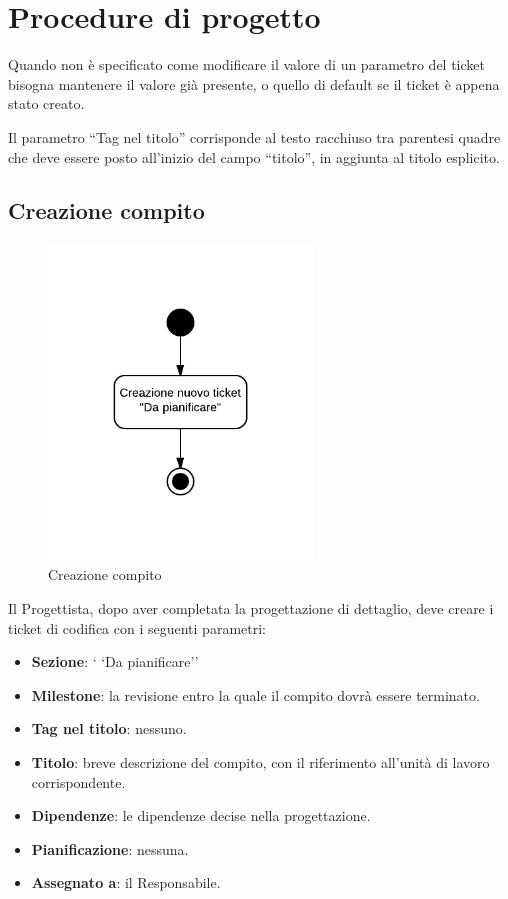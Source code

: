 \section{Procedure di progetto}
\label{procedurediprogetto}

Quando non è specificato come modificare il valore di un parametro del ticket bisogna mantenere il valore già presente, o quello di default se il ticket è appena stato creato.

Il parametro ``Tag nel titolo'' corrisponde al testo racchiuso tra parentesi quadre che deve essere posto all'inizio del campo ``titolo'', in aggiunta al titolo esplicito.

\subsection{Creazione compito}

\begin{figure}[H]
    \centering
    \includegraphics[width=7cm]{uml-processi/Creazione_compito.png}
    \caption{Creazione compito}
\end{figure}

Il Progettista, dopo aver completata la progettazione di dettaglio, deve creare i ticket di codifica con i seguenti parametri:
\begin{itemize}
 \item \textbf{Sezione}: `	`Da pianificare''
 \item \textbf{Milestone}: la revisione entro la quale il compito dovrà essere terminato.
 \item \textbf{Tag nel titolo}: nessuno.
 \item \textbf{Titolo}: breve descrizione del compito, con il riferimento all'unità di lavoro corrispondente.
 \item \textbf{Dipendenze}: le dipendenze decise nella progettazione.
 \item \textbf{Pianificazione}: nessuna.
 \item \textbf{Assegnato a}: il Responsabile.
\end{itemize}

